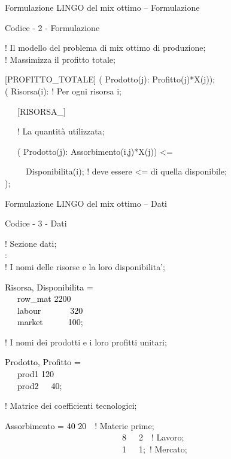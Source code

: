 \documentclass{beamer}
\begin{document}
\begin{frame}{Formulazione LINGO del mix ottimo -- Formulazione}
\begin{exampleblock}
{Codice - 2 - Formulazione}

\textcolor{comment_c}{! Il modello del problema di mix ottimo di produzione;}\\
\textcolor{comment_c}{! Massimizza il profitto totale;}

\textcolor{rowname_c}{{[}PROFITTO\_TOTALE{]}}  ( Prodotto(j):
Profitto(j){*}X(j));\\

( Risorsa(i): \textcolor{comment_c}{! Per ogni risorsa i;}

~~~\textcolor{rowname_c}{{[}RISORSA\_{]}}

~~~\textcolor{comment_c}{! La quantit\`a utilizzata;}

~~~( Prodotto(j): Assorbimento(i,j){*}X(j)) <= 

~~~~~Disponibilita(i); \textcolor{comment_c}{! deve essere <= di quella disponibile;}\\
); 
\end{exampleblock}

\end{frame}

\begin{frame}{Formulazione LINGO del mix ottimo -- Dati}

\begin{exampleblock}
{\scriptsize Codice - 3 - Dati

\textcolor{comment_c}{! Sezione dati;}\\
:\\
\textcolor{comment_c}{! I nomi delle risorse e la loro disponibilita';}

\textcolor{black}{%
Risorsa, Disponibilita =\\
~~~row\_mat 2200\\
~~~labour~~~~~~~320\\
~~~market~~~~~~100;}

\textcolor{comment_c}{! I nomi dei prodotti e i loro profitti unitari;}

\textcolor{black}{%
Prodotto, Profitto =\\
~~~prod1 120\\
~~~prod2~~~40;}

\textcolor{comment_c}{! Matrice dei coefficienti tecnologici;}

\textcolor{black}{%
Assorbimento = 40 20}~~\textcolor{comment_c}{! Materie prime;}\\
~~~~~~~~~~~~~~~~~~~~~~~~~~~~\textcolor{black}{8~~~2}~~\textcolor{comment_c}{! Lavoro;}\\
~~~~~~~~~~~~~~~~~~~~~~~~~~~~\textcolor{black}{1~~~1;}~\textcolor{comment_c}{! Mercato;}

}
\end{exampleblock}

\end{frame}
\end{document}
